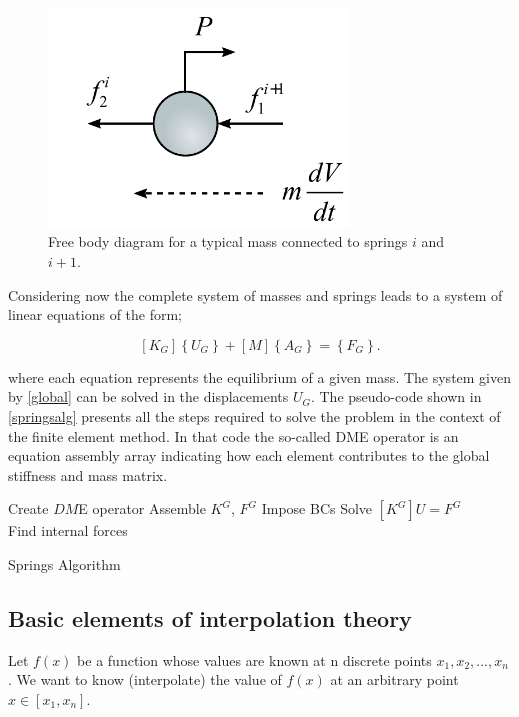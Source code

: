 \begin{figure}[H]
\centering
\includegraphics[width=8cm]{dcl_mass.pdf}
\caption{Free body diagram for a typical mass connected to springs $i$ and $i+1$.}
\label{fig:dclmass}
\end{figure}

Considering now the complete system of masses and springs leads to a system of linear equations of the form;

\begin{equation}
\left[ {{K_G}} \right]\left\{ {{U_G}} \right\} + \left[ M \right]\left\{ {{A_G}} \right\} = \left\{ {{F_G}} \right\}.
\label{global}
\end{equation}

where each equation represents the equilibrium of a given mass. The system given by \cref{global} can be solved in the displacements $U_G$. The pseudo-code shown in \cref{springsalg} presents all the steps required to solve the problem in the context of the finite element method. In that code the so-called DME operator is an equation assembly array indicating how each element contributes to the global stiffness and mass matrix.


\begin{algorithm}[H]
 \SetAlgoLined
 Create $DM$E operator\;
 Assemble $K^G$, $F^G$\;
Impose BCs\;
Solve $[K^G]U=F^G$\\
Find internal forces
\caption{Springs Algorithm}
\label{springsalg}
\end{algorithm}


\subsection{Basic elements of interpolation theory}
Let $f(x)$ be a function whose values are known at n discrete points ${x_1, x_2,...,x_n}$. We want to know (interpolate) the value of $f(x)$ at an arbitrary point $x \in \left[ {{x_1},{x_n}} \right]$.

